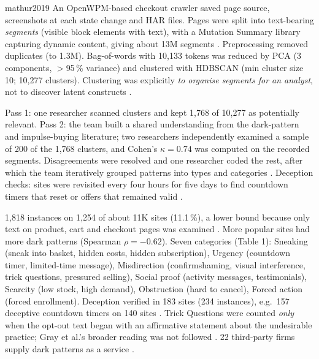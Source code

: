 \begin{papercard}{mathur2019}
 An OpenWPM-based checkout crawler saved page source, screenshots at each state change and HAR files. Pages were split into text-bearing \emph{segments} (visible block elements with text), with a Mutation Summary library capturing dynamic content, giving about 13M segments . Preprocessing removed duplicates (to 1.3M). Bag-of-words with 10,133 tokens was reduced by PCA (3 components, $>$95\,\% variance) and clustered with HDBSCAN (min cluster size 10; 10,277 clusters). Clustering was explicitly \emph{to organise segments for an analyst}, not to discover latent constructs .

 Pass 1: one researcher scanned clusters and kept 1,768 of 10,277 as potentially relevant. Pass 2: the team built a shared understanding from the dark-pattern and impulse-buying literature; two researchers independently examined a sample of 200 of the 1,768 clusters, and Cohen's $\kappa=0.74$ was computed on the recorded segments. Disagreements were resolved and one researcher coded the rest, after which the team iteratively grouped patterns into types and categories . Deception checks: sites were revisited every four hours for five days to find countdown timers that reset or offers that remained valid .

 1,818 instances on 1,254 of about 11K sites (11.1\,\%), a lower bound because only text on product, cart and checkout pages was examined . More popular sites had more dark patterns (Spearman $\rho=-0.62$). Seven categories (Table 1): Sneaking (sneak into basket, hidden costs, hidden subscription), Urgency (countdown timer, limited-time message), Misdirection (confirmshaming, visual interference, trick questions, pressured selling), Social proof (activity messages, testimonials), Scarcity (low stock, high demand), Obstruction (hard to cancel), Forced action (forced enrollment). Deception verified in 183 sites (234 instances), e.g.\ 157 deceptive countdown timers on 140 sites . Trick Questions were counted \emph{only} when the opt-out text began with an affirmative statement about the undesirable practice; Gray et al.'s broader reading was not followed . 22 third-party firms supply dark patterns as a service .


\end{papercard}
